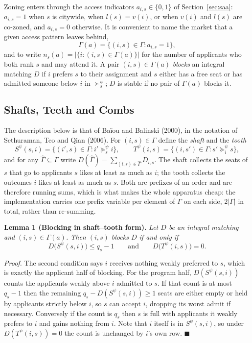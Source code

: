 \documentclass{article}
\begin{document}
Zoning enters through the access indicators $a_{i,s} \in \{0,1\}$ of Section~\ref{sec:saa}: $a_{i,s} = 1$ when $s$ is citywide, when $l(s) = v(i)$, or when $v(i)$ and $l(s)$ are co-zoned, and $a_{i,s} = 0$ otherwise. It is convenient to name the market that a given access pattern leaves behind,
\begin{equation}\label{eq:ap_restricted_market}
\Gamma(a) = \{(i,s) \in \Gamma : a_{i,s} = 1\},
\end{equation}
and to write $n_s(a) = |\{i : (i,s) \in \Gamma(a)\}|$ for the number of applicants who both rank $s$ and may attend it. A pair $(i,s) \in \Gamma(a)$ \emph{blocks} an integral matching $D$ if $i$ prefers $s$ to their assignment and $s$ either has a free seat or has admitted someone below $i$ in $\succ_s^\psi$; $D$ is stable if no pair of $\Gamma(a)$ blocks it.

\subsection{Shafts, Teeth and Combs}
\label{app:ap_combs}

The description below is that of Baïou and Balinski (2000), in the notation of Sethuraman, Teo and Qian (2006). For $(i,s) \in \Gamma$ define the \emph{shaft} and the \emph{tooth}
\begin{equation}\label{eq:ap_shaft_tooth}
S^\psi(s,i) = \{(i',s) \in \Gamma : i' \succeq_s^\psi i\},
\qquad
T^\psi(i,s) = \{(i,s') \in \Gamma : s' \succeq_i^\psi s\},
\end{equation}
and for any $\hat\Gamma \subseteq \Gamma$ write $D(\hat\Gamma) = \sum_{(i,s) \in \hat\Gamma} D_{i,s}$. The shaft collects the seats of $s$ that go to applicants $s$ likes at least as much as $i$; the tooth collects the outcomes $i$ likes at least as much as $s$. Both are prefixes of an order and are therefore running sums, which is what makes the whole apparatus cheap: the implementation carries one prefix variable per element of $\Gamma$ on each side, $2|\Gamma|$ in total, rather than re-summing.

\noindent\textbf{Lemma 1 (Blocking in shaft--tooth form).} \textit{Let $D$ be an integral matching and $(i,s) \in \Gamma(a)$. Then $(i,s)$ blocks $D$ if and only if}
\begin{equation}\label{eq:ap_blocking}
D\big(S^\psi(s,i)\big) \le q_s - 1
\qquad\text{and}\qquad
D\big(T^\psi(i,s)\big) = 0 .
\end{equation}

\textit{Proof.} The second condition says $i$ receives nothing weakly preferred to $s$, which is exactly the applicant half of blocking. For the program half, $D(S^\psi(s,i))$ counts the applicants weakly above $i$ admitted to $s$. If that count is at most $q_s - 1$ then the remaining $q_s - D(S^\psi(s,i)) \ge 1$ seats are either empty or held by applicants strictly below $i$, so $s$ can accept $i$, dropping its worst admit if necessary. Conversely if the count is $q_s$ then $s$ is full with applicants it weakly prefers to $i$ and gains nothing from $i$. Note that $i$ itself is in $S^\psi(s,i)$, so under $D(T^\psi(i,s)) = 0$ the count is unchanged by $i$'s own row. $\blacksquare$
\end{document}
